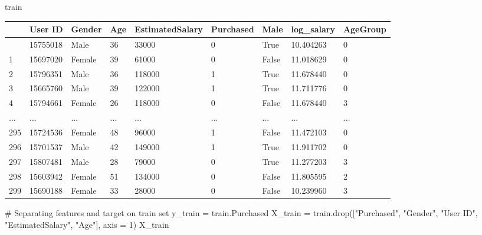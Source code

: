 \documentclass[
  letterpaper,
  DIV=11,
  numbers=noendperiod]{scrreprt}
\newenvironment{Shaded}{\begin{snugshade}}{\end{snugshade}}
\newcommand{\CommentTok}[1]{\textcolor[rgb]{0.37,0.37,0.37}{#1}}
\newcommand{\DecValTok}[1]{\textcolor[rgb]{0.68,0.00,0.00}{#1}}
\newcommand{\NormalTok}[1]{\textcolor[rgb]{0.00,0.23,0.31}{#1}}
\newcommand{\OperatorTok}[1]{\textcolor[rgb]{0.37,0.37,0.37}{#1}}
\newcommand{\StringTok}[1]{\textcolor[rgb]{0.13,0.47,0.30}{#1}}
\begin{document}
\begin{Shaded}
\begin{Highlighting}[]
\NormalTok{train}
\end{Highlighting}
\end{Shaded}

\begin{longtable}[]{@{}lllllllll@{}}
\toprule\noalign{}
& User ID & Gender & Age & EstimatedSalary & Purchased & Male &
log\_salary & AgeGroup \\
\midrule\noalign{}
\endhead
\bottomrule\noalign{}
\endlastfoot
0 & 15755018 & Male & 36 & 33000 & 0 & True & 10.404263 & 0 \\
1 & 15697020 & Female & 39 & 61000 & 0 & False & 11.018629 & 0 \\
2 & 15796351 & Male & 36 & 118000 & 1 & True & 11.678440 & 0 \\
3 & 15665760 & Male & 39 & 122000 & 1 & True & 11.711776 & 0 \\
4 & 15794661 & Female & 26 & 118000 & 0 & False & 11.678440 & 3 \\
... & ... & ... & ... & ... & ... & ... & ... & ... \\
295 & 15724536 & Female & 48 & 96000 & 1 & False & 11.472103 & 0 \\
296 & 15701537 & Male & 42 & 149000 & 1 & True & 11.911702 & 0 \\
297 & 15807481 & Male & 28 & 79000 & 0 & True & 11.277203 & 3 \\
298 & 15603942 & Female & 51 & 134000 & 0 & False & 11.805595 & 2 \\
299 & 15690188 & Female & 33 & 28000 & 0 & False & 10.239960 & 3 \\
\end{longtable}

\begin{Shaded}
\begin{Highlighting}[]
\CommentTok{\# Separating features and target on train set}
\NormalTok{y\_train }\OperatorTok{=}\NormalTok{ train.Purchased}
\NormalTok{X\_train }\OperatorTok{=}\NormalTok{ train.drop([}\StringTok{"Purchased"}\NormalTok{, }\StringTok{"Gender"}\NormalTok{, }\StringTok{"User ID"}\NormalTok{, }\StringTok{"EstimatedSalary"}\NormalTok{, }\StringTok{"Age"}\NormalTok{], axis }\OperatorTok{=} \DecValTok{1}\NormalTok{)}
\NormalTok{X\_train}
\end{Highlighting}
\end{Shaded}
\end{document}
